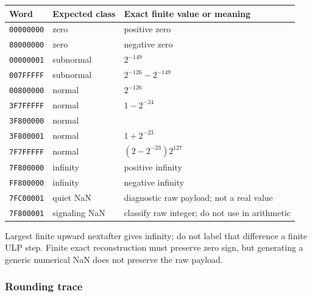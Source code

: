 {\def\LTcaptype{none} %
\begin{longtable}[]{@{}
  >{\raggedright\arraybackslash}p{}
  >{\raggedright\arraybackslash}p{}
  >{\raggedright\arraybackslash}p{}@{}}
\toprule\noalign{}
\begin{minipage}[b]{\linewidth}\raggedright
Word
\end{minipage} & \begin{minipage}[b]{\linewidth}\raggedright
Expected class
\end{minipage} & \begin{minipage}[b]{\linewidth}\raggedright
Exact finite value or meaning
\end{minipage} \\
\midrule\noalign{}
\endhead
\bottomrule\noalign{}
\endlastfoot
\texttt{00000000} & zero & positive zero \\
\texttt{80000000} & zero & negative zero \\
\texttt{00000001} & subnormal & \(2^{-149}\) \\
\texttt{007FFFFF} & subnormal & \(2^{-126}-2^{-149}\) \\
\texttt{00800000} & normal & \(2^{-126}\) \\
\texttt{3F7FFFFF} & normal & \(1-2^{-24}\) \\
\texttt{3F800000} & normal & 1 \\
\texttt{3F800001} & normal & \(1+2^{-23}\) \\
\texttt{7F7FFFFF} & normal & \((2-2^{-23})2^{127}\) \\
\texttt{7F800000} & infinity & positive infinity \\
\texttt{FF800000} & infinity & negative infinity \\
\texttt{7FC00001} & quiet NaN & diagnostic raw payload; not a real value \\
\texttt{7F800001} & signaling NaN & classify raw integer; do not use in arithmetic \\
\end{longtable}
}

Largest finite upward nextafter gives infinity; do not label that difference a finite ULP step. Finite exact reconstruction must preserve zero sign, but generating a generic numerical NaN does not preserve the raw payload.

\subsubsection{Rounding trace}\label{appendix-92ff77d4dfdc-rounding-trace}

